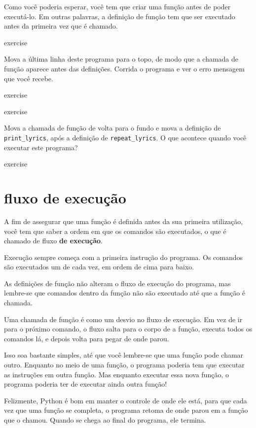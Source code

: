 \documentclass[10pt]{book}
\begin{document}
\begin{exercise}
Como você poderia esperar, você tem que criar uma função antes de poder
executá-lo. Em outras palavras, a definição de função tem que ser
executado antes da primeira vez que é chamado.

\begin{} exercise

Mova a última linha deste programa
para o topo, de modo que a chamada de função aparece antes das definições. Corrida
o programa e ver o erro
mensagem que você recebe.

\end{} exercise

\begin{} exercise

Mova a chamada de função de volta para o fundo
e mova a definição de \verb "print_lyrics", após a definição de
\verb "repeat_lyrics". O que acontece quando você executar este programa?

\end{} exercise


\section{fluxo de execução}

A fim de assegurar que uma função é definida antes da sua primeira utilização,
você tem que saber a ordem em que os comandos são executados, o que é
chamado de fluxo {\bf de execução}.

Execução sempre começa com a primeira instrução do programa.
Os comandos são executados um de cada vez, em ordem de cima para baixo.

As definições de função não alteram o fluxo de execução do
programa, mas lembre-se que comandos dentro da função não são
executado até que a função é chamada.

Uma chamada de função é como um desvio no fluxo de execução. Em vez de
ir para o próximo comando, o fluxo salta para o corpo de
a função, executa todos os comandos lá, e depois volta
para pegar de onde parou.

Isso soa bastante simples, até que você lembre-se que uma função pode
chamar outro. Enquanto no meio de uma função, o programa poderia
tem que executar as instruções em outra função. Mas enquanto
executar essa nova função, o programa poderia ter de executar ainda
outra função!

Felizmente, Python é bom em manter o controle de onde ele está, para que cada
vez que uma função se completa, o programa retoma de onde parou em
a função que o chamou. Quando se chega ao final do programa,
ele termina.


\end{exercise}
\end{document}
